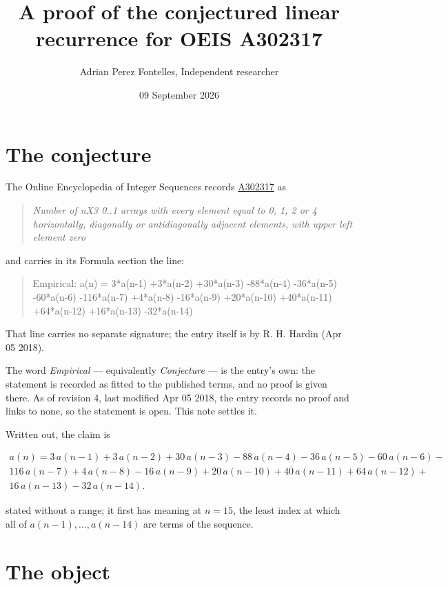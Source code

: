 \documentclass[11pt]{article}
\title{A proof of the conjectured linear recurrence for OEIS A302317}
\author{Adrian Perez Fontelles, Independent researcher}
\date{09 September 2026}
\theoremstyle{definition}
\begin{document}
\maketitle
\section{The conjecture}

The Online Encyclopedia of Integer Sequences records \href{https://oeis.org/A302317}{A302317} as

\begin{quote}\itshape Number of nX3 0..1 arrays with every element equal to 0, 1, 2 or 4 horizontally, diagonally or antidiagonally adjacent elements, with upper left element zero\end{quote}

and carries in its Formula section the line:

\begin{quote}\ttfamily Empirical: a(n) = 3*a(n-1) +3*a(n-2) +30*a(n-3) -88*a(n-4) -36*a(n-5) -60*a(n-6) -116*a(n-7) +4*a(n-8) -16*a(n-9) +20*a(n-10) +40*a(n-11) +64*a(n-12) +16*a(n-13) -32*a(n-14)\end{quote}

That line carries no separate signature; the entry itself is by R. H. Hardin (Apr 05 2018).

The word {\itshape Empirical} --- equivalently {\itshape Conjecture} --- is the entry's own: the statement is recorded as fitted to the published terms, and no proof is given there. As of revision 4, last modified Apr 05 2018, the entry records no proof and links to none, so the statement is open. This note settles it.

Written out, the claim is

\begin{multline*} a(n) = 3\,a(n-1) + 3\,a(n-2) + 30\,a(n-3) - 88\,a(n-4) - 36\,a(n-5) - 60\,a(n-6) - \\ 116\,a(n-7) + 4\,a(n-8) - 16\,a(n-9) + 20\,a(n-10) + 40\,a(n-11) + 64\,a(n-12) + \\ 16\,a(n-13) - 32\,a(n-14). \end{multline*}

stated without a range; it first has meaning at $n = 15$, the least index at which all of $a(n-1),\dots,a(n-14)$ are terms of the sequence.

\section{The object}
\end{document}
